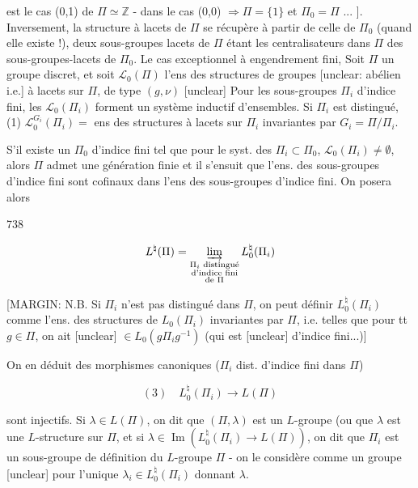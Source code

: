 \newpage


est le cas (0,1) de $\Pi \simeq \mathbb{Z}$ - dans le cas (0,0) $\Rightarrow \Pi=\{1\}$
et $\Pi_0 = \Pi$ ... ]. Inversement, la structure
à lacets de $\Pi$ se récupère à partir de
celle de $\Pi_0$ (quand elle existe !), deux
sous-groupes lacets de $\Pi$ étant les centralisateurs
dans $\Pi$ des sous-groupes-lacets de $\Pi_0$. Le cas
exceptionnel à engendrement fini,
Soit $\Pi$ un groupe discret, et
soit $\mathcal{L}_0(\Pi)$ l'ens des structures de groupes
[unclear: abélien i.e.]
à lacets sur $\Pi$, de type $(g,\nu)$ [unclear]
Pour les sous-groupes $\Pi_i$ d'indice fini,
les $\mathcal{L}_0(\Pi_i)$ forment un système inductif
d'ensembles. Si $\Pi_i$ est distingué,
(1) $\mathcal{L}_0^{G_i}(\Pi_i) = $ ens des structures à lacets
sur $\Pi_i$ invariantes par
$G_i = \Pi/\Pi_i$.

S'il existe un $\Pi_0$ d'indice fini tel que
pour le syst. des $\Pi_i \subset \Pi_0$,
$\mathcal{L}_0(\Pi_i) \neq \emptyset$, alors $\Pi$ admet
une génération finie et il s'ensuit
que l'ens. des sous-groupes d'indice fini
sont cofinaux dans l'ens des sous-groupes
d'indice fini. On posera alors

\newpage


738

$$L^\natural(\Pi) = \varinjlim_{\substack{\Pi_i \text{ distingué} \\ \text{d'indice fini} \\ \text{de } \Pi}} L_0^\natural(\Pi_i)$$

[MARGIN: N.B. Si $\Pi_i$ n'est pas distingué dans $\Pi$, on peut définir $L_0^\natural(\Pi_i)$ comme l'ens. des structures de $L_0(\Pi_i)$ invariantes par $\Pi$, i.e. telles que pour tt $g \in \Pi$, on ait [unclear] $\in L_0(g \Pi_i g^{-1})$ (qui est [unclear] d'indice fini...)]

On en déduit des morphismes canoniques ($\Pi_i$ dist. d'indice fini dans $\Pi$)

$$(3) \quad L_0^\natural(\Pi_i) \to L(\Pi)$$

sont injectifs. Si $\lambda \in L(\Pi)$, on dit que $(\Pi, \lambda)$ est un $L$-groupe (ou que $\lambda$ est une $L$-structure sur $\Pi$, et si $\lambda \in \operatorname{Im}(L_0^\natural(\Pi_i) \to L(\Pi))$, on dit que $\Pi_i$ est un sous-groupe de définition du $L$-groupe $\Pi$ - on le considère comme un groupe [unclear] pour l'unique $\lambda_i \in L_0^\natural(\Pi_i)$ donnant $\lambda$.

